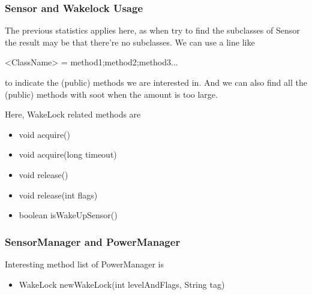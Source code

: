 \documentclass{article}
\begin{document}
\subsubsection{Sensor and Wakelock Usage}
The previous statistics applies here, as when 
try to find the subclasses of Sensor the result 
may be that there're no subclasses. 
We can use a line like
\begin{verbatime}
<ClassName> = method1;method2;method3...
\end{verbatime}
to indicate the (public) methods we are interested 
in. And we can also find all the (public) methods 
with soot when the amount is too large.
\par
{
	Here, WakeLock related methods are
	\begin{itemize}
		\item void acquire()
		\item void acquire(long timeout)
		\item void release()
		\item void release(int flags)
	\end{itemize}
}
\par
{
	\begin{itemize}
		\item boolean isWakeUpSensor()
	\end{itemize}
}

\subsubsection{SensorManager and PowerManager}
Interesting method list of PowerManager is
\begin{itemize}
	\item WakeLock newWakeLock(int levelAndFlags, String tag)
\end{itemize}
\end{document}
